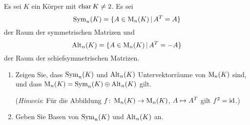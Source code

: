 \documentclass[a4paper, 10pt]{scrartcl}
\begin{document}
\begin{question}[subtitle = Symmetrische und schiefsymmetrische Matrizen]
  Es sei $K$ ein Körper mit $\operatorname{char} K \neq 2$.
  Es sei
  \[
      \operatorname{Sym}_{n}(K)
    = \{ A \in \operatorname{M}_{n}(K) \,|\, A^T = A \}
  \]
  der Raum der symmetrischen Matrizen und
  \[
      \operatorname{Alt}_{n}(K)
    = \{ A \in \operatorname{M}_{n}(K) \,|\, A^T = -A\}
  \]
  der Raum der schiefsymmetrischen Matrizen.
  \begin{enumerate}
    \item
      Zeigen Sie, dass $\operatorname{Sym}_{n}(K)$ und $\operatorname{Alt}_{n}(K)$ Untervektorräume von $\operatorname{M}_{n}(K)$ sind, und dass $\operatorname{M}_{n}(K) = \operatorname{Sym}_{n}(K) \oplus \operatorname{Alt}_{n}(K)$ gilt.
      
      (\emph{Hinweis}:
       Für die Abbildung $f \colon \operatorname{M}_{n}(K) \to \operatorname{M}_{n}(K)$, $A \mapsto A^T$ gilt $f^2 = \operatorname{id}$.)
    \item
      Geben Sie Basen von $\operatorname{Sym}_{n}(K)$ und $\operatorname{Alt}_{n}(K)$ an.
  \end{enumerate}
\end{question}
\end{document}
